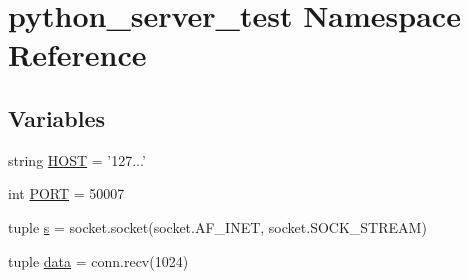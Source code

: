 \hypertarget{namespacepython__server__test}{\section{python\-\_\-server\-\_\-test Namespace Reference}
\label{namespacepython__server__test}
}
\subsection*{Variables}
\begin{DoxyCompactItemize}
\item 
string \hyperlink{namespacepython__server__test_ad58043a7b7b230922688efa34ba27360}{H\-O\-S\-T} = '127...'
\item 
int \hyperlink{namespacepython__server__test_aef25402ff217d52e13595e15db533362}{P\-O\-R\-T} = 50007
\item 
tuple \hyperlink{namespacepython__server__test_a6caadb6ba3499c7bb77e87e70033cb6e}{s} = socket.\-socket(socket.\-A\-F\-\_\-\-I\-N\-E\-T, socket.\-S\-O\-C\-K\-\_\-\-S\-T\-R\-E\-A\-M)
\item 
tuple \hyperlink{namespacepython__server__test_a90f9b90774f5dfbde525eb537d21b4d9}{data} = conn.\-recv(1024)
\end{DoxyCompactItemize}


